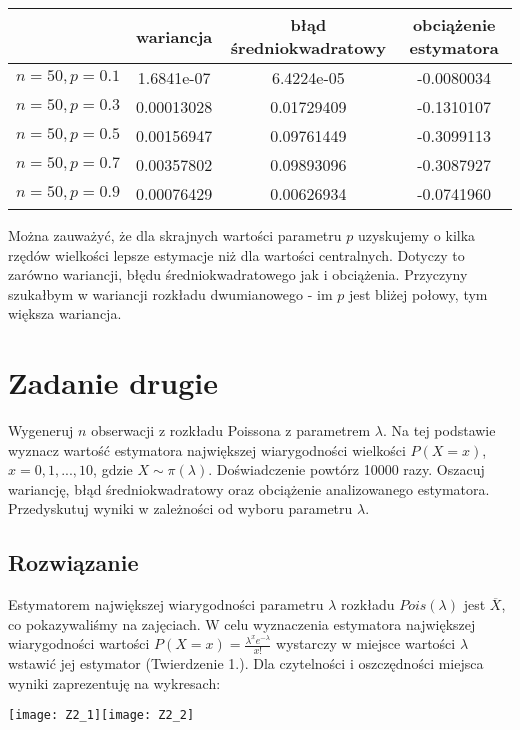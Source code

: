 \documentclass[a4paper]{article}
\begin{document}
\begin{table}[H]
\centering
\begin{tabular}{|c|c|c|c|}
\hline
                  & \textbf{wariancja}   & \textbf{błąd średniokwadratowy} & \textbf{obciążenie estymatora} \\ \hline
$n=50,p=0.1$ & 1.6841e-07 & 6.4224e-05 & -0.0080034 \\ \hline
$n=50,p=0.3$ & 0.00013028 & 0.01729409 & -0.1310107 \\ \hline
$n=50,p=0.5$ & 0.00156947 & 0.09761449 & -0.3099113 \\ \hline
$n=50,p=0.7$ & 0.00357802 & 0.09893096 & -0.3087927 \\ \hline
$n=50,p=0.9$ & 0.00076429 & 0.00626934 & -0.0741960 \\ \hline
\end{tabular}
\end{table}

Można zauważyć, że dla skrajnych wartości parametru $p$ uzyskujemy o kilka rzędów wielkości lepsze estymacje niż dla wartości centralnych. Dotyczy to zarówno wariancji, błędu średniokwadratowego jak i obciążenia. Przyczyny szukałbym w wariancji rozkładu dwumianowego - im $p$ jest bliżej połowy, tym większa wariancja.

\section{Zadanie drugie}
Wygeneruj $n$ obserwacji z rozkładu Poissona z parametrem $\lambda$. Na tej podstawie wyznacz wartość estymatora największej wiarygodności wielkości $P(X=x)$, $x=0,1,...,10$, gdzie $X\sim \pi(\lambda)$. Doświadczenie powtórz 10000 razy. Oszacuj wariancję, błąd średniokwadratowy oraz obciążenie analizowanego estymatora. Przedyskutuj wyniki w zależności od wyboru parametru $\lambda$.

\subsection{Rozwiązanie}
Estymatorem największej wiarygodności parametru $\lambda$ rozkładu $Pois(\lambda)$ jest $\overline{X}$, co  pokazywaliśmy na zajęciach. W celu wyznaczenia estymatora największej wiarygodności wartości $P(X=x)=\frac{\lambda^xe^{-\lambda}}{x!}$ wystarczy w miejsce wartości $\lambda$ wstawić jej estymator (Twierdzenie 1.). Dla czytelności i oszczędności miejsca wyniki zaprezentuję na wykresach:
\begin{center}
\texttt{[image: Z2\_1]}\texttt{[image: Z2\_2]}
\end{center}
\end{document}
